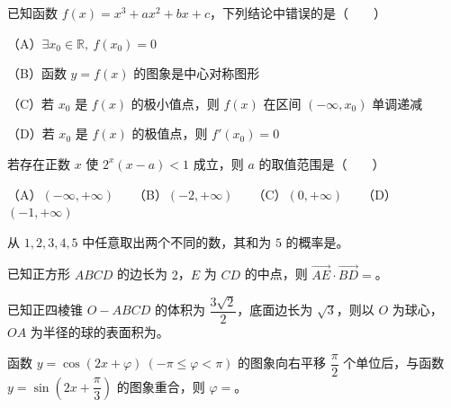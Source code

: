 \begin{question}
已知函数 $f(x)=x^3+ax^2+bx+c$，下列结论中错误的是\mbox{（　　）}

（A）$\exists x_0\in\mathbb R,\ f(x_0)=0$

（B）函数 $y=f(x)$ 的图象是中心对称图形

（C）若 $x_0$ 是 $f(x)$ 的极小值点，则 $f(x)$ 在区间 $(-\infty,x_0)$ 单调递减

（D）若 $x_0$ 是 $f(x)$ 的极值点，则 $f'(x_0)=0$

\end{question}
\begin{question}
若存在正数 $x$ 使 $2^x(x-a)<1$ 成立，则 $a$ 的取值范围是\mbox{（　　）}

（A）$(-\infty,+\infty)$　　（B）$(-2,+\infty)$　　（C）$(0,+\infty)$　　（D）$(-1,+\infty)$

\end{question}

\begin{question}
从 $1,2,3,4,5$ 中任意取出两个不同的数，其和为 $5$ 的概率是\gkblank{}。

\end{question}
\begin{question}
已知正方形 $ABCD$ 的边长为 $2$，$E$ 为 $CD$ 的中点，则 $\overrightarrow{AE}\cdot\overrightarrow{BD}=$\gkblank{}。

\end{question}
\begin{question}
已知正四棱锥 $O-ABCD$ 的体积为 $\dfrac{3\sqrt2}{2}$，底面边长为 $\sqrt3$，则以 $O$ 为球心，$OA$ 为半径的球的表面积为\gkblank{}。

\end{question}
\begin{question}
函数 $y=\cos(2x+\varphi)\ (-\pi\leqslant\varphi<\pi)$ 的图象向右平移 $\dfrac\pi2$ 个单位后，与函数 $y=\sin\left(2x+\dfrac\pi3\right)$ 的图象重合，则 $\varphi=$\gkblank{}。

\end{question}

